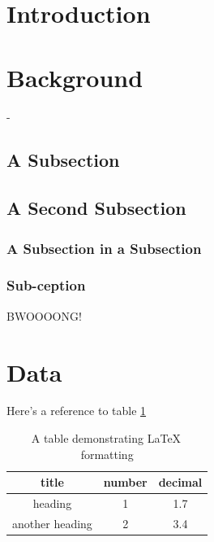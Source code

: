 \documentclass{workreport}
\begin{document}
\begin{body}
\section{Introduction}

\lipsum[1-6]

\section{Background}

\lipsum[1-2]-

	\subsection{A Subsection}

	\lipsum[1]

	\subsection{A Second Subsection}

	\lipsum[2]

	\subsubsection{A Subsection in a Subsection}

	\lipsum[1]

	\subsubsection{Sub-ception}

	\lipsum[1]

	BWOOOONG!

\section{Data}

\lipsum[1-2]

Here's a reference to table \ref{tbl:exampletable}

\begin{table}
	\centering
	\begin{tabular}{|c|c|c|} \hline
		title & number & decimal \\ \hline
		heading & 1 & 1.7 \\ \hline
		another heading & 2 & 3.4 \\ \hline
	\end{tabular}
	\caption{A table demonstrating \LaTeX \, formatting}
	\label{tbl:exampletable}
\end{table}


\end{body}
\end{document}
